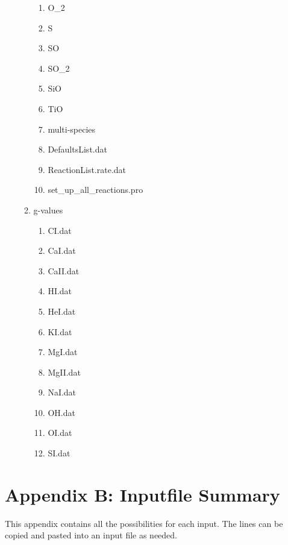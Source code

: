 \documentclass[11pt]{article}
\begin{document}
\begin{enumerate}
\begin{enumerate}
\begin{enumerate}
    \item {\color{blue}O\_2}
    \item {\color{blue}S}
    \item {\color{blue}SO}
    \item {\color{blue}SO\_2}
    \item {\color{blue}SiO}
    \item {\color{blue}TiO}
    \item {\color{blue}multi-species}
    \item {\color{red}DefaultsList.dat}
    \item {\color{red}ReactionList.rate.dat}
    \item set\_up\_all\_reactions.pro
  \end{enumerate}
  \item{\color{blue}g-values}
    \begin{enumerate}
    \item {\color{red}CI.dat}
    \item {\color{red}CaI.dat}
    \item {\color{red}CaII.dat}
    \item {\color{red}HI.dat}
    \item {\color{red}HeI.dat}
    \item {\color{red}KI.dat}
    \item {\color{red}MgI.dat}
    \item {\color{red}MgII.dat}
    \item {\color{red}NaI.dat}
    \item {\color{red}OH.dat}
    \item {\color{red}OI.dat}
    \item {\color{red}SI.dat}
    \end{enumerate}
  \end{enumerate}
\end{enumerate}

\section{Appendix B: Inputfile Summary}

This appendix contains all the possibilities for each input. The lines can be 
copied and pasted into an input file as needed.
\end{document}

